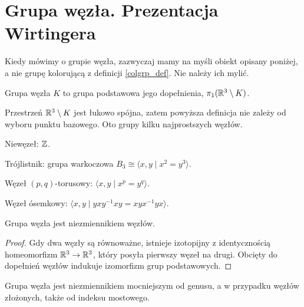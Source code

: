 \section{Grupa węzła. Prezentacja Wirtingera} %
\label{sec:group_wirtinger}
Kiedy mówimy o grupie węzła,
zazwyczaj mamy na myśli obiekt opisany poniżej,
a nie grupę kolorującą z definicji \ref{colgrp_def}.
Nie należy ich mylić.

\begin{definition}
    \label{def:knot_group}
    Grupa węzła $K$ to grupa podstawowa jego dopełnienia, $\pi_1(\mathbb R^3 \setminus K)$.
\end{definition}

Przestrzeń $\mathbb R^3 \setminus K$ jest łukowo spójna,
zatem powyższa definicja nie zależy od wyboru punktu bazowego.
Oto grupy kilku najprostszych węzłów.

\begin{example}
    Niewęzeł: $\mathbb Z$.
\end{example}

\begin{example}
    Trójlistnik: grupa warkoczowa $B_3 \cong \langle x, y \mid x^2 = y^3\rangle$.
\end{example}

\begin{example}
    Węzeł $(p,q)$-torusowy: $\langle x, y \mid x^p = y^q \rangle$.
\end{example}

\begin{example}
    Węzeł ósemkowy: $\langle x, y \mid yxy^{{-1}}xy=xyx^{{-1}}yx \rangle$.
\end{example}

\begin{proposition}
    \label{prop:knot_group_invariant}
    Grupa węzła jest niezmiennikiem węzłów.
\end{proposition}

\begin{proof}
    Gdy dwa węzły są równoważne,
    istnieje izotopijny z identycznością homeomorfizm $\mathbb R^3 \to \mathbb R^3$,
    który posyła pierwszy węzeł na drugi.
    Obcięty do dopełnień węzłów indukuje izomorfizm grup podstawowych.
\end{proof}

\begin{proposition}
    Grupa węzła jest niezmiennikiem mocniejszym od genusu, a w przypadku węzłów złożonych, także od indeksu mostowego.
\end{proposition}

